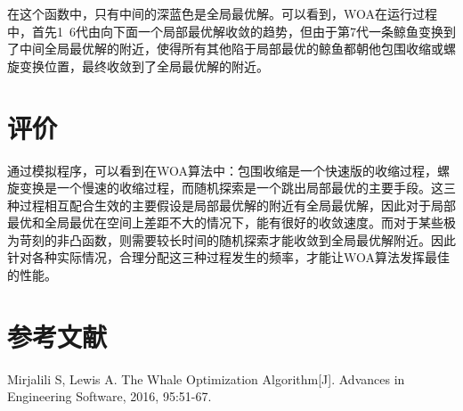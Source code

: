 \documentclass[12pt,a4paper]{article}
\begin{document}
在这个函数中，只有中间的深蓝色是全局最优解。可以看到，WOA在运行过程中，首先1~6代由向下面一个局部最优解收敛的趋势，但由于第7代一条鲸鱼变换到了中间全局最优解的附近，使得所有其他陷于局部最优的鲸鱼都朝他包围收缩或螺旋变换位置，最终收敛到了全局最优解的附近。

\section{评价}
通过模拟程序，可以看到在WOA算法中：包围收缩是一个快速版的收缩过程，螺旋变换是一个慢速的收缩过程，而随机探索是一个跳出局部最优的主要手段。这三种过程相互配合生效的主要假设是局部最优解的附近有全局最优解，因此对于局部最优和全局最优在空间上差距不大的情况下，能有很好的收敛速度。而对于某些极为苛刻的非凸函数，则需要较长时间的随机探索才能收敛到全局最优解附近。因此针对各种实际情况，合理分配这三种过程发生的频率，才能让WOA算法发挥最佳的性能。

\section{参考文献}
Mirjalili S, Lewis A. The Whale Optimization Algorithm[J]. Advances in Engineering Software, 2016, 95:51-67.
\end{document}
